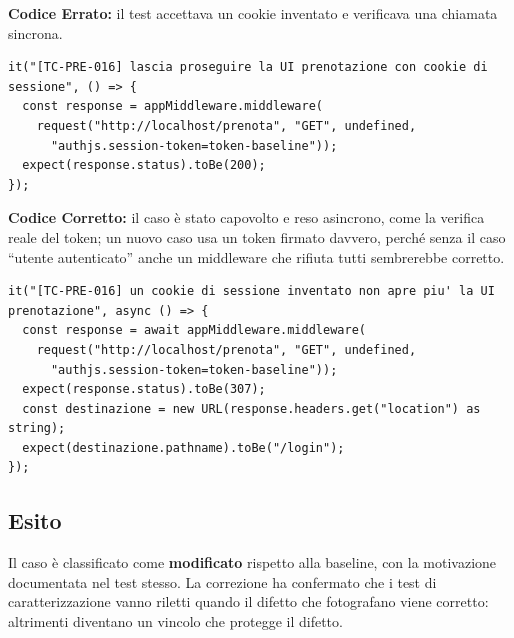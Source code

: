 \documentclass[11pt,a4paper,oneside,openany]{book}
\begin{document}
\textbf{Codice Errato:} il test accettava un cookie inventato e verificava una
chiamata sincrona.

\begin{lstlisting}
it("[TC-PRE-016] lascia proseguire la UI prenotazione con cookie di sessione", () => {
  const response = appMiddleware.middleware(
    request("http://localhost/prenota", "GET", undefined,
      "authjs.session-token=token-baseline"));
  expect(response.status).toBe(200);
});
\end{lstlisting}

\textbf{Codice Corretto:} il caso è stato capovolto e reso asincrono, come la
verifica reale del token; un nuovo caso usa un token firmato davvero, perché
senza il caso \enquote{utente autenticato} anche un middleware che rifiuta
tutti sembrerebbe corretto.

\begin{lstlisting}
it("[TC-PRE-016] un cookie di sessione inventato non apre piu' la UI prenotazione", async () => {
  const response = await appMiddleware.middleware(
    request("http://localhost/prenota", "GET", undefined,
      "authjs.session-token=token-baseline"));
  expect(response.status).toBe(307);
  const destinazione = new URL(response.headers.get("location") as string);
  expect(destinazione.pathname).toBe("/login");
});
\end{lstlisting}

\subsection{Esito}

Il caso è classificato come \textbf{modificato} rispetto alla baseline, con
la motivazione documentata nel test stesso. La correzione ha confermato che i
test di caratterizzazione vanno riletti quando il difetto che fotografano
viene corretto: altrimenti diventano un vincolo che protegge il difetto.
\end{document}
